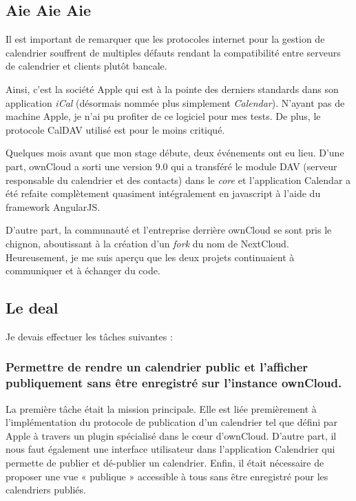 \documentclass[10pt,a4paper]{report}
\begin{document}
	\subsection{Aie Aie Aie}
	
	Il est important de remarquer que les protocoles internet pour la gestion de calendrier souffrent de multiples défauts rendant la compatibilité entre serveurs de calendrier et clients plutôt bancale.
	
	Ainsi, c'est la société Apple qui est à la pointe des derniers standards dans son application \textit{iCal} (désormais nommée plus simplement \textit{Calendar}). N'ayant pas de machine Apple, je n'ai pu profiter de ce logiciel pour mes tests. De plus, le protocole CalDAV utilisé est pour le moins critiqué.
	
	Quelques mois avant que mon stage débute, deux événements ont eu lieu. D'une part, ownCloud a sorti une version 9.0 qui a transféré le module DAV (serveur responsable du calendrier et des contacts) dans le \textit{core} et l'application Calendar a été refaite complètement quasiment intégralement en javascript à l'aide du framework AngularJS.
	
	D'autre part, la communauté et l'entreprise derrière ownCloud se sont pris le chignon, aboutissant à la création d'un \textit{fork} du nom de NextCloud. Heureusement, je me suis aperçu que les deux projets continuaient à communiquer et à échanger du code.
	
	\subsection{Le deal}
	Je devais effectuer les tâches suivantes :
	
	\subsubsection{Permettre de rendre un calendrier public et l'afficher publiquement sans être enregistré sur l'instance ownCloud.}
	
	La première tâche était la mission principale. Elle est liée premièrement à l'implémentation du protocole de publication d'un calendrier tel que défini par Apple à travers un plugin spécialisé dans le cœur d'ownCloud. D'autre part, il nous faut également une interface utilisateur dans l'application Calendrier qui permette de publier et dé-publier un calendrier. Enfin, il était nécessaire de proposer une vue « publique » accessible à tous sans être enregistré pour les calendriers publiés.
	
\end{document}
